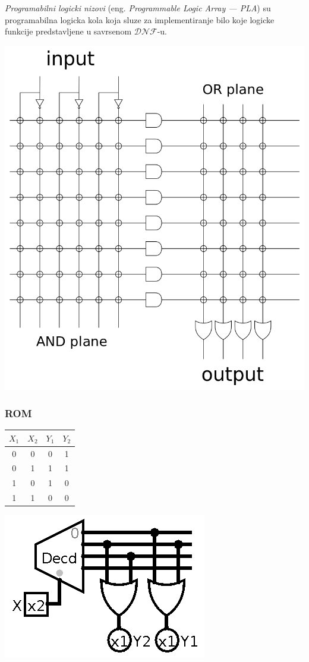 \documentclass[12p,a4paper]{article}
\begin{document}
\begin{multicols}{2}
    \emph{Programabilni logicki nizovi} 
    (eng. \emph{Programmable Logic Array --- PLA}) su programabilna logicka 
    kola koja sluze za implementiranje bilo koje logicke funkcije 
    predstavljene u savrsenom $\mathcal{DNF}$-u.

    \includegraphics[width=0.8\columnwidth]{Figures/pla.png}

    \subsubsection{ROM}

    \begin{tabular}{*{4}{c}}
        $X_1$ & $X_2$ & $Y_1$ & $Y_2$ \\
        \midrule    
        0 & 0 & 0 & 1 \\
        0 & 1 & 1 & 1 \\
        1 & 0 & 1 & 0 \\
        1 & 1 & 0 & 0 \\
    \end{tabular}

    \includegraphics[width=0.5\columnwidth]{Figures/rom.png}


\end{multicols}
\end{document}
